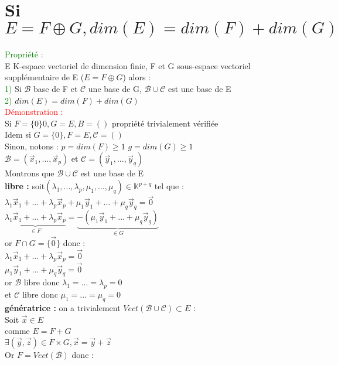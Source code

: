 \documentclass{article}
\begin{document}
\section{Si $E= F \oplus G, dim(E)=dim(F)+dim(G)$}
\textcolor{green}{Propriété :} \\
E K-espace vectoriel de dimension finie, F et G sous-espace vectoriel supplémentaire de E ($E=F \oplus G$) alors : \\
\textcolor{green}{1)} Si $\mathcal B$ base de F et $\mathcal C$ une base de G, $\mathcal B \cup \mathcal C$ est une base de E \\
\textcolor{green}{2)} $dim(E)=dim(F)+dim(G)$ \\
\textcolor{red}{Démonstration :} \\
Si $F=\lbrace 0 \rbrace 0,G=E,B=()$ propriété trivialement vérifiée \\
Idem si $G=\lbrace 0 \rbrace,F=E,\mathcal C=() $ \\
Sinon, notons : $p=dim(F) \geq 1$ $g=dim(G) \geq 1$ \\
$\mathcal B = (\vec x_1, ... ,\vec x_p)$ et $\mathcal C = (\vec y_1, ..., \vec y_q)$ \\
Montrons que $\mathcal B \cup \mathcal C$ est une base de E  \\
{\bf libre :} soit$(\lambda_1,...,\lambda_p,\mu_1,...,\mu_q) \in \mathbb K^{p+q}$ tel que : \\
$\lambda_1 \vec x_1 + ... + \lambda_p \vec x_p + \mu_1 \vec y_1 +... + \mu_q \vec y_q = \vec 0$ \\
$\underbrace{\lambda_1 \vec x_1 + ... + \lambda_p \vec x_p}_{\in F} = \underbrace{ -(\mu_1 \vec y_1 +... + \mu_q \vec y_q)}_{\in G}$ \\
or $F \cap  G =\lbrace \vec 0 \rbrace$ donc : \\
$\lambda_1 \vec x_1 + ... + \lambda_p \vec x_p=\vec 0$ \\
$\mu_1 \vec y_1 +... + \mu_q \vec y_q=\vec 0$ \\
or $\mathcal B$ libre donc $ \lambda_1=...=\lambda_p=0$ \\
et $\mathcal C$ libre donc $\mu_1=...=\mu_q=0$ \\
{\bf génératrice :} on a trivialement $Vect(\mathcal B \cup \mathcal C) \subset E$ : \\
Soit $\vec x \in E$ \\
comme $E=F +G $ \\
$\exists (\vec y, \vec z) \in F \times G, \vec x =\vec y + \vec z$ \\
Or $F= Vect(\mathcal B)$ donc : \\
\end{document}
